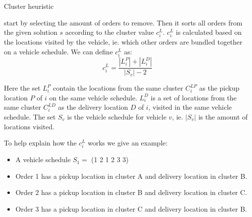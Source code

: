 \documentclass[../main.tex]{subfiles}
\begin{document}
\begin{algorithm}
    \caption{Cluster heuristic}\label{alg:cluster}
    \begin{algorithmic}[1]
        $, $p$}
        \State select the number of orders to reinsert $q$
        \State add orders to array A acending based on cluster value $c_i$
        \State empty order set $I$
        \Repeat
            \State choose a random number $y$ between $[0,1]$
            \State remove the order in position $y^p$ in $A$ from $s$ 
            \State add removed order to $I$
        \Until {$|I| = q$}
        \For{$i\in I$}
            \State find vehicle schedule $S_v$ which maximizes $c_i$
            \State insert $i$ in best possible position in $S_v$
            \State update $s$ based on $S_v$
        \EndFor
        \State
        \Return $s$
        \EndFunction
    \end{algorithmic}
\end{algorithm}

 start by selecting the amount of orders to remove. Then it sorts all orders from the given solution $s$ according to the cluster value $c^L_i$. $c^L_i$ is calculated based on the locations visited by the vehicle, ie. which other orders are bundled together on a vehicle schedule.
We can define $c^L_i$ as:
\begin{equation}
    c^L_i = \dfrac{|L^P_{i}|+|L^D_{i}|}{|S_v|-2}
\end{equation}

Here the set $L^P_{i}$ contain the locations from the same cluster $C^{LP}_i$ as the pickup location $P$ of $i$ on the same vehicle schedule. 
$L^D_{i}$ is a set of locations from the same cluster $C^{LD}_i$ as the delivery location $D$ of $i$, visited in the same vehicle schedule.
The set $S_v$ is the vehicle schedule for vehicle $v$, ie. $|S_v|$ is the amount of locations visited. \par

To help explain how the $c^L_i$ works we give an example:
\begin{itemize}
    \item A vehicle schedule $S_1 =$ (1 2 1 2 3 3) 
    \item Order 1 has a pickup location in cluster A and delivery location in cluster B.
    \item Order 2 has a pickup location in cluster B and delivery location in cluster C.
    \item Order 3 has a pickup location in cluster C and delivery location in cluster B.
\end{itemize}
\end{document}
